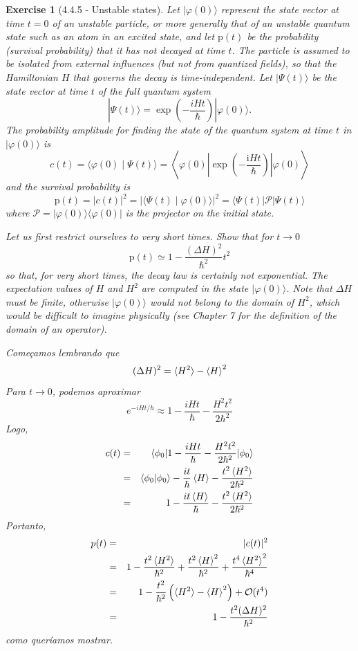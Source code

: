 \documentclass[12pt]{article}
\def\be{\begin{equation}}
\def\ee{\end{equation}}
\def\bea{\begin{eqnarray*}}
\def\eea{\end{eqnarray*}}
\def\f{\frac}
\def\l{\left}
\def\r{\right}
\newtheorem{exercise}{Exercise}
\begin{document}
	\begin{exercise}[4.4.5 - Unstable states]
		Let $|\varphi(0)\rangle$ represent the state vector at time $t=0$ of an unstable particle, or more generally that of an unstable quantum state such as an atom in an excited state, and let $\mathrm{p}(t)$ be the probability (survival probability) that it has not decayed at time $t$. The particle is assumed to be isolated from external influences (but not from quantized fields), so that the Hamiltonian $H$ that governs the decay is time-independent. Let $|\Psi(t)\rangle$ be the state vector at time $t$ of the full quantum system
		$$
		|\Psi(t)\rangle=\exp \left(-\frac{i H t}{\hbar}\right)|\varphi(0)\rangle .
		$$
		The probability amplitude for finding the state of the quantum system at time $t$ in $|\varphi(0)\rangle$ is
		$$
		c(t)=\langle\varphi(0) \mid \Psi(t)\rangle=\left\langle\varphi(0)\left|\exp \left(-\frac{\mathrm{i} H t}{\hbar}\right)\right| \varphi(0)\right\rangle
		$$
		and the survival probability is
		$$
		\mathrm{p}(t)=|c(t)|^{2}=|\langle\Psi(t) \mid \varphi(0)\rangle|^{2}=\langle\Psi(t)|\mathcal{P}| \Psi(t)\rangle
		$$
		where $\mathcal{P}=|\varphi(0)\rangle\langle\varphi(0)|$ is the projector on the initial state.
		\begin{exercises}
			\item Let us first restrict ourselves to very short times. Show that for $t \rightarrow 0$
			$$
			\mathrm{p}(t) \simeq 1-\frac{(\Delta H)^{2}}{\hbar^{2}} t^{2}
			$$
			so that, for very short times, the decay law is certainly not exponential. The expectation values of $H$ and $H^{2}$ are computed in the state $|\varphi(0)\rangle$. Note that $\Delta H$ must be finite, otherwise $|\varphi(0)\rangle$ would not belong to the domain of $H^{2}$, which would be difficult to imagine physically (see Chapter 7 for the definition of the domain of an operator).
			\begin{multianswer}
				Começamos lembrando que
				\be
					(\Delta H)^2 = \braket{H^2} - \braket{H}^2
				\ee
				Para $t\to0$, podemos aproximar
				\be
					e^{-iHt/\hbar} \approx 1 -\f{iHt}{\hbar} - \f{H^2t^2}{2\hbar^2}
				\ee
				Logo, 
				\bea
					c(t) &=& \braket{\phi_0 | 1 - \f{iHt}{\hbar} - \f{H^2t^2}{2\hbar^2} | \phi_0} \\
						&=& \braket{\phi_0|\phi_0} - \f{it}{\hbar}  \braket{H} - \f{t^2\braket{H^2}}{2\hbar^2}\\
						&=& 1 - \f{it\braket{H}}{\hbar} - \f{t^2\braket{H^2}}{2\hbar^2}
				\eea
				Portanto,
				\bea
					p(t) &=& |c(t)|^2 \\
						&=& 1  - \f{t^2\braket{H^2}}{\hbar^2}  + \f{t^2\braket{H}^2}{\hbar^2} + \f{t^4\braket{H^2}^2}{\hbar^4} \\
						&=& 1 - \f{t^2}{\hbar^2}\l(\braket{H^2}  - \braket{H}^2 \r) + \mathcal{O}(t^4)  \\
						&=& 1 - \f{t^2(\Delta H)^2}{\hbar^2}
				\eea
				como queríamos mostrar. 
			\end{multianswer}
		

\end{exercises}
\end{exercise}
\end{document}
